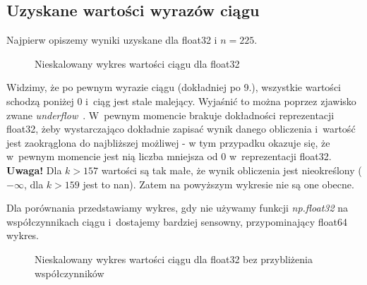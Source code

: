 \subsection{Uzyskane wartości wyrazów ciągu}

\quad Najpierw opiszemy wyniki uzyskane dla float32 i $n = 225$.
\begin{figure}[h!]
	\caption{Nieskalowany wykres wartości ciągu dla float32}
	\label{zad2:graph1}
\end{figure}
Widzimy, że po pewnym wyrazie ciągu (dokładniej po 9.), wszystkie wartości schodzą poniżej 0 i~ciąg jest stale malejący. Wyjaśnić to można poprzez zjawisko zwane 
\emph{underflow}~\cite{underflow_wiki}. W~pewnym momencie brakuje dokładności reprezentacji float32, żeby wystarczająco dokładnie zapisać wynik danego obliczenia i~wartość jest zaokrąglona 
do najbliższej możliwej - w tym przypadku okazuje się, że w~pewnym momencie jest nią liczba mniejsza od 0 w~reprezentacji float32.
\newline
\textbf{Uwaga!} Dla $k > 157$ wartości są tak małe, że wynik obliczenia jest nieokreślony ($-\infty$, dla $k > 159$ jest to nan). Zatem na powyższym wykresie nie są one obecne.

\newpage
Dla porównania przedstawiamy wykres, gdy nie używamy funkcji \emph{np.float32} na współczynnikach ciągu i~dostajemy bardziej sensowny, przypominający float64 wykres.
\begin{figure}[ht!]
	\caption{Nieskalowany wykres wartości ciągu dla float32 bez przybliżenia współczynników}
	\label{zad2:graph2}
\end{figure}

